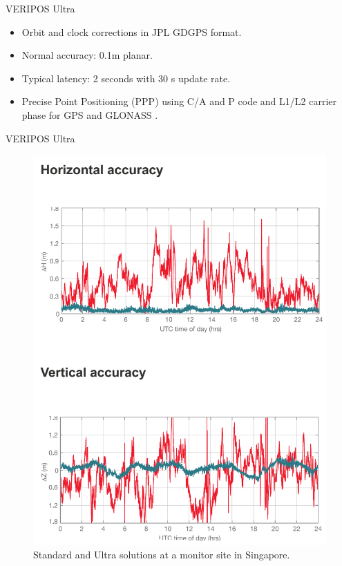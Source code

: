 \documentclass[11pt]{beamer}
\begin{document}
\begin{frame}{VERIPOS Ultra}
 
	\begin{itemize}	
		\item Orbit and clock corrections in JPL GDGPS format.
		\item Normal accuracy: 0.1m planar. 
		\item Typical latency: 2 seconds with 30 s update rate.%
		\item Precise Point Positioning (PPP) using C/A and P code and L1/L2 carrier phase for GPS and GLONASS .
	\end{itemize}	
\end{frame}	

\begin{frame}{VERIPOS Ultra}
	
	\begin{figure}
		
		\includegraphics[height=0.8\textheight]{pic/Ultra.png}
		\caption{Standard and Ultra solutions at a monitor site in Singapore.}
	\end{figure}
	
\end{frame}
\end{document}
